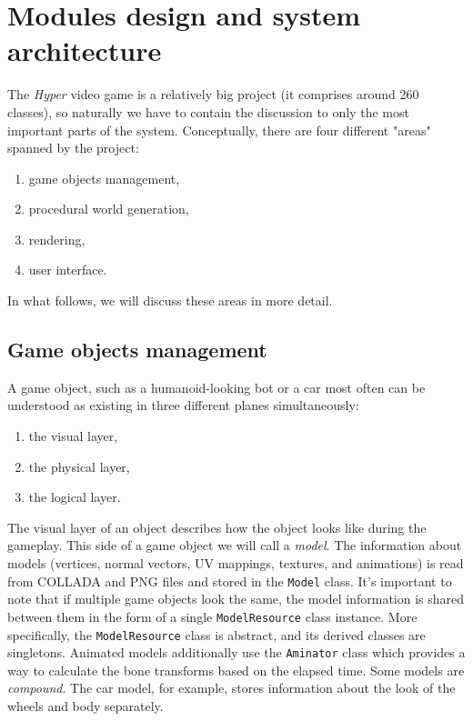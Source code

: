 \section{Modules design and system architecture}


The \textit{Hyper} video game is a relatively big project (it comprises around 260 classes), so naturally we have to contain the discussion to only the most important parts of the system.
Conceptually, there are four different "areas" spanned by the project:
\begin{enumerate}
    \item game objects management,
    \item procedural world generation,
    \item rendering,
    \item user interface.
\end{enumerate}

In what follows, we will discuss these areas in more detail.

\subsection{Game objects management}
A game object, such as a humanoid-looking bot or a car most often can be understood as existing in three different planes simultaneously:
\begin{enumerate}
    \item the visual layer,
    \item the physical layer,
    \item the logical layer.
\end{enumerate}
The visual layer of an object describes how the object looks like during the gameplay.
This side of a game object we will call a \textit{model}.
The information about models (vertices, normal vectors, UV mappings, textures, and animations) is read from COLLADA and PNG files and stored in the \texttt{Model} class.
It's important to note that if multiple game objects look the same, the model information is shared between them in the form of a single \texttt{ModelResource} class instance.
More specifically, the \texttt{ModelResource} class is abstract, and its derived classes are singletons.
Animated models additionally use the \texttt{Aminator} class which provides a way to calculate the bone transforms based on the elapsed time.
Some models are \textit{compound}.
The car model, for example, stores information about the look of the wheels and body separately.

